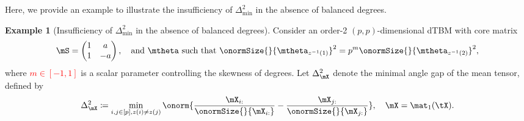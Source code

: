 \documentclass[lettersize,onecolumn,journal]{IEEEtran}
\theoremstyle{definition}
\theoremstyle{definition}
\newtheorem{example}{Example}
\begin{document}
{%
Here, we provide an example to illustrate the insufficiency of $\Delta_{\min}^2$ in the absence of balanced degrees. 



\begin{example}[Insufficiency of $\Delta_{\min}^2$ in the absence of balanced degrees] Consider an order-2 $(p,p)$-dimensional dTBM with core matrix
\begin{equation}\label{eq:modelexample}
    \mS = \begin{pmatrix} 1 &a\\
    1 & -a
    \end{pmatrix}, \quad \text{and} \ \mtheta \text{ such that } \onormSize{}{\mtheta_{z^{-1}(1)}}^2 = p^m \onormSize{}{\mtheta_{z^{-1}(2)}}^2,
\end{equation}
where \textcolor{red}{$m \in [-1,1]$} is a scalar parameter controlling the skewness of degrees. Let $\Delta_{\mX}^2$ denote the minimal angle gap of the mean tensor, defined by
\begin{equation}\label{eq:delta_x}
    \Delta_{\mX}^2 \coloneqq \min_{i,j \in [p], z(i) \neq z(j)} \onorm{ \frac{\mX_{i:}}{\onormSize{}{\mX_{i:}}}  -  \frac{\mX_{j:}}{\onormSize{}{\mX_{j:}}}  }, \quad \mX = \mat_1(\tX). %
\end{equation}


\end{example}}
\end{document}
